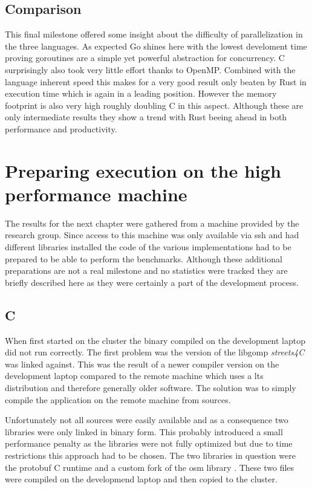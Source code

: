 \subsection{Comparison}
\label{subsec:Implementation::ParallelBenchmark::Comparison}

This final milestone offered some insight about the difficulty of parallelization in the three languages. As expected Go shines here with the lowest develoment time proving \glspl{goroutine} are a simple yet powerful abstraction for concurrency. C surprisingly also took very little effort thanks to OpenMP. Combined with the language inherent speed this makes for a very good result only beaten by Rust in execution time which is again in a leading position. However the memory footprint is also very high roughly doubling C in this aspect. Although these are only intermediate results they show a trend with Rust beeing ahead in both performance and productivity.

\section{Preparing execution on the high performance machine}
\label{sec:Implementation::ClusterPreparation}

The results for the next chapter were gathered from a machine provided by the research group. Since access to this machine was only available via \gls{ssh} and had different libraries installed the code of the various implementations had to be prepared to be able to perform the benchmarks. Although these additional preparations are not a real milestone and no statistics were tracked they are briefly described here as they were certainly a part of the development process.

\subsection*{C}
\label{subsec:Implementation::ClusterPreparation::C}

When first started on the cluster the binary compiled on the development laptop did not run correctly. The first problem was the version of the libgomp \textit{streets4C} was linked against. This was the result of a newer compiler version on the development laptop compared to the remote machine which uses a \gls{lts} distribution and therefore generally older software. The solution was to simply compile the application on the remote machine from sources.

Unfortunately not all sources were easily available and as a consequence two libraries were only linked in binary form. This probably introduced a small performance penalty as the libraries were not fully optimized but due to time restrictions this approach had to be chosen. The two libraries in question were the \gls{protobuf} C runtime  and a custom fork of the \gls{osm} library . These two files were compiled on the developmend laptop and then copied to the cluster.

